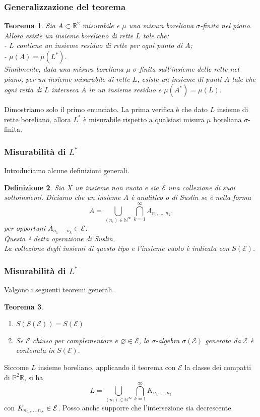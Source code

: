 \documentclass[11pt]{beamer} %
\newcommand{\R}{\mathbb{R}}
\newcommand{\N}{\mathbb{N}}
\renewcommand{\P}{\mathbb{P}}
\newcommand{\E}{\mathcal{E}}
\newcommand{\<}{\langle}
\renewcommand{\>}{\rangle}
\theoremstyle{theorem}
\newtheorem{teo}{Teorema}
\theoremstyle{theorem}
\theoremstyle{theorem}
\theoremstyle{theorem}
\newtheorem{defin}[teo]{Definizione}
\theoremstyle{theorem}
\begin{document}
\begin{frame}
	\frametitle{Generalizzazione del teorema}
	
	\begin{teo}
		Sia $A \subset \mathbb{R}^{2}$ misurabile e $\mu$ una misura boreliana $\sigma$-finita nel piano. Allora esiste un insieme boreliano di rette $L$ tale che: \\
		- $L$ contiene un insieme residuo di rette per ogni punto di $A$;\\
		- $\mu(A)=\mu(L^*)$. \\ \pause
		Similmente, data una misura boreliana $\mu$ $\sigma$-finita sull'insieme delle rette nel piano, per un insieme misurabile di rette $L$, esiste un insieme di punti $A$ tale che ogni retta di $L$ interseca $A$ in un insieme residuo e $\mu(A^*)=\mu(L)$.
	\end{teo}
	\pause
	Dimostriamo solo il primo enunciato. La prima verifica è che dato $L$ insieme di rette boreliano, allora $L^*$ è misurabile rispetto a qualsiasi misura $\mu$ boreliana $\sigma$-finita.
\end{frame}

\begin{frame}
	\frametitle{Misurabilità di $L^*$}
	Introduciamo alcune definizioni generali.

\begin{defin}
	Sia $X$ un insieme non vuoto e sia $\mathcal{E}$ una collezione di suoi sottoinsiemi. \pause Diciamo che un insieme $A$ è analitico o di Suslin se è nella forma
	$$
	A=\bigcup_{\left(n_{i}\right) \in \mathbb{N}^{\infty}} \bigcap_{k=1}^{\infty} A_{n_{1}, \ldots, n_{k}} .
	$$
	per opportuni $A_{n_{1}, \ldots, n_{k}} \in \E$.\\ \pause
	Questa è detta operazione di Suslin.\\
	La collezione degli insiemi di questo tipo e l'insieme vuoto è indicata con $S(\mathcal{E})$.
\end{defin}	

\end{frame}

\begin{frame}[fragile]
\frametitle{Misurabilità di $L^*$}	
Valgono i seguenti teoremi generali. \pause

\begin{teo}
	\begin{enumerate}[i]
		\item $S(S(\mathcal{E}))=S(\mathcal{E})$\\ \pause
		\item Se $\E$ chiuso per complementare e $\varnothing \in \E$, la $\sigma$-algebra $\sigma(\mathcal{E})$ generata da $\mathcal{E}$ è contenuta in $S(\mathcal{E}).$
	\end{enumerate}
\end{teo}
\pause
Siccome $L$ insieme boreliano, applicando il teorema con $\E$ la classe dei compatti di $\P^2 \R$, si ha
$$L=\bigcup_{{(n_i)}\in{\N}^\infty}\bigcap_{k=1}^\infty K_{n_1,\ldots,n_k}$$
con $K_{n_1,\ldots,n_k}\in {\cal E}$. Posso anche supporre che l'intersezione sia decrescente.

\end{frame}
\end{document}

